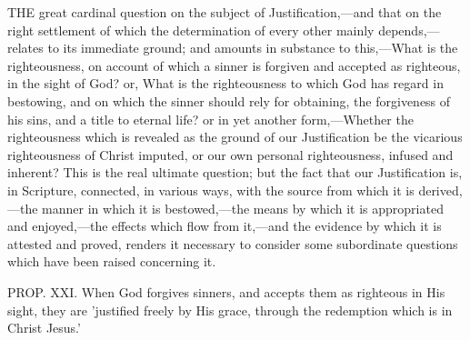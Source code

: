 \documentclass[
]{book}
\begin{document}
THE great cardinal question on the subject of Justification,---and that on the right settlement of which the determination of every other mainly depends,---relates to its immediate ground; and amounts in substance to this,---What is the righteousness, on account of which a sinner is forgiven and accepted as righteous, in the sight of God? or, What is the righteousness to which God has regard in bestowing, and on which the sinner should rely for obtaining, the forgiveness of his sins, and a title to eternal life? or in yet another form,---Whether the righteousness which is revealed as the ground of our Justification be the vicarious righteousness of Christ imputed, or our own personal righteousness, infused and inherent? This is the real ultimate question; but the fact that our Justification is, in Scripture, connected, in various ways, with the source from which it is derived,---the manner in which it is bestowed,---the means by which it is appropriated and enjoyed,---the effects which flow from it,---and the evidence by which it is attested and proved, renders it necessary to consider some subordinate questions which have been raised concerning it.

PROP. XXI. When God forgives sinners, and accepts them as righteous in His sight, they are 'justified freely by His grace, through the redemption which is in Christ Jesus.'
\end{document}
